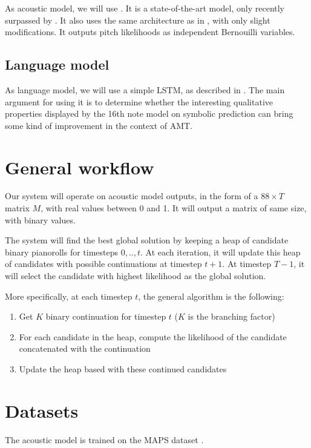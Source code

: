 \documentclass{article}
\begin{document}
As acoustic model, we will use \cite{Kelz2016}.
It is a state-of-the-art model, only recently surpassed by \cite{Hawthorne2018}.
It also uses the same architecture as in \cite{sigtia2016end}, with only slight modifications.
It outputs pitch likelihoods as independent Bernouilli variables.

\subsection{Language model}

As language model, we will use a simple LSTM, as described in \cite{Ycart2017}.
The main argument for using it is to determine whether the interesting qualitative properties displayed by the 16th note model on symbolic prediction can bring some kind of improvement in the context of AMT.


\section{General workflow}
\label{sec:workflow}

Our system will operate on acoustic model outputs, in the form of a $88\times T$ matrix $M$,
with real values between 0 and 1.
It will output a matrix of same size, with binary values.

The system will find the best global solution by keeping a heap of candidate binary pianorolls
for timesteps $0,..,t$.
At each iteration, it will update this heap of candidates with possible continuations at timestep $t+1$.
At timestep $T-1$, it will select the candidate with highest likelihood as the global solution.

More specifically, at each timestep $t$, the general algorithm is the following:

\begin{enumerate}
\item Get $K$ binary continuation for timestep $t$ ($K$ is the branching factor)
\item For each candidate in the heap, compute the likelihood of the candidate concatenated with the continuation
\item Update the heap based with these continued candidates
\end{enumerate}

\section{Datasets}

The acoustic model is trained on the MAPS dataset \cite{emiya2010multipitch}.
\end{document}

